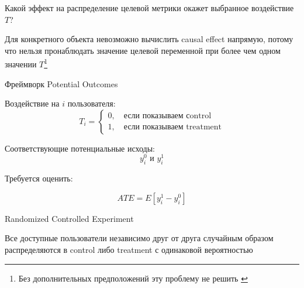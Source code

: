 \documentclass[11pt,aspectratio=169]{beamer}
\begin{document}
\begin{frame}{}

\begin{tcolorbox}[colback=info!5,colframe=info!80,title=Задача]
Какой эффект на распределение целевой метрики окажет выбранное воздействие $T$?
\end{tcolorbox}

\vfill

\begin{tcolorbox}[colback=warn!5,colframe=warn!80,title=Фундаментальная Проблема Causal Inference]
Для конкретного объекта невозможно вычислить causal effect напрямую, потому что нельзя пронаблюдать значение целевой переменной при более чем одном значении $T$\footnote{Без дополнительных предположений эту проблему не решить \cite{GELMAN}}
\end{tcolorbox}

\end{frame}

\begin{frame}{Фреймворк Potential Outcomes}

Воздействие на $i$ пользователя:
\[
T_i = \begin{cases}
0, \quad \text{если показываем сontrol} \\
1, \quad \text{если показываем treatment}
\end{cases}
\]

Соответствующие потенциальные исходы:
\[
y_i^0 \text{ и } y_i^1
\]

Требуется оценить:
\begin{tcolorbox}[colback=info!5,colframe=info!80,title=Average Treatment Effect,center,width=6cm,center title]
\[
ATE = E \left[ y_i^1 - y_i^0 \right]
\]
\end{tcolorbox}

\end{frame}

\begin{frame}{Randomized Controlled Experiment}

\begin{tcolorbox}[colback=info!5,colframe=info!80,title=Схема эксперимента]
Все доступные пользователи независимо друг от друга случайным образом распределяются в control либо treatment с одинаковой вероятностью
\end{tcolorbox}

\end{frame}
\end{document}
